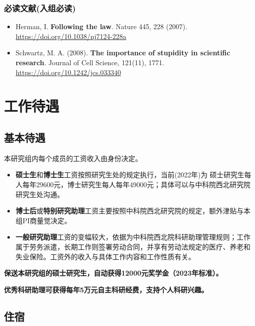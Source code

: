 \documentclass[
]{ctexbook}
\providecommand{\tightlist}{%
  \setlength{\itemsep}{0pt}\setlength{\parskip}{0pt}}
\begin{document}
\hypertarget{ux5fc5ux8bfbux6587ux732eux5165ux7ec4ux5fc5ux8bfb}{%
\subsection{必读文献(入组必读)}\label{ux5fc5ux8bfbux6587ux732eux5165ux7ec4ux5fc5ux8bfb}}

\begin{itemize}
\tightlist
\item
  Herman, I. \textbf{Following the law}. Nature 445, 228 (2007). \url{https://doi.org/10.1038/nj7124-228a}
\item
  Schwartz, M. A. (2008). \textbf{The importance of stupidity in scientific research}. Journal of Cell Science, 121(11), 1771. \url{https://doi.org/10.1242/jcs.033340}
\end{itemize}

\hypertarget{allowance}{%
\chapter{工作待遇}\label{allowance}}

\hypertarget{ux57faux672cux5f85ux9047}{%
\section{基本待遇}\label{ux57faux672cux5f85ux9047}}

本研究组内每个成员的工资收入由身份决定。

\begin{itemize}
\tightlist
\item
  \textbf{硕士生}和\textbf{博士生}工资按照研究生处的规定执行，当前(2022年)为
  硕士研究生每人每年29600元，博士研究生每人每年49000元；具体可以与中科院西北研究院研究生处沟通。
\item
  \textbf{博士后}或\textbf{特别研究助理}工资主要按照中科院西北研究院的规定，额外津贴与本组PI商量觉决定。
\item
  \textbf{一般研究助理}工资的变幅较大，依据为中科院西北院科研助理管理规则；工作属于劳务派遣，长期工作则签署劳动合同，并享有劳动法规定的医疗、养老和失业保险。工资外的收入与具体工作内容和工作性质有关。
\end{itemize}

\textbf{保送本研究组的硕士研究生，自动获得12000元奖学金（2023年标准）。}

\textbf{优秀科研助理可获得每年5万元自主科研经费，支持个人科研兴趣。}

\hypertarget{ux4f4fux5bbf}{%
\section{住宿}\label{ux4f4fux5bbf}}
\end{document}
